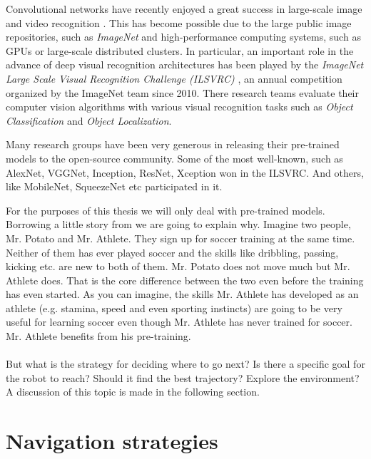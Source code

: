 \documentclass[12pt,a4paper]{report}
\newcommand{\term}{\textit}
\newcommand{\acronym}{\MakeUppercase}
\begin{document}
	Convolutional networks have recently enjoyed a great success in large-scale image 
	and video recognition \citep{vgg}. This has become possible due to the large public 
	image repositories, such as \term{ImageNet} \citep{Deng} and high-performance 
	computing systems, such as \acronym{gpu}s or large-scale distributed clusters. In 
	particular, an important role in the advance of deep visual recognition architectures 
	has been played by the \term{ImageNet Large Scale Visual Recognition Challenge 
	(\acronym{ilsvrc})} \citep{Russakovsky}, an annual competition organized by the 
	ImageNet team since 2010. There research teams evaluate their computer vision 
	algorithms with various visual recognition tasks such as \term{Object Classification} 
	and \term{Object Localization}.
	\par
	Many research groups have been very generous in releasing their pre-trained 
	models to the open-source community. Some of the most well-known, such as AlexNet, 
	VGGNet, Inception, ResNet, Xception \citep{alexnet, vgg} won in the \acronym{ilsvrc}. 
	And others, like MobileNet, SqueezeNet etc participated in it.
	\par
	For the purposes of this thesis we will only deal with pre-trained models. Borrowing 
	a little story from \citet{Gupta} we are going to explain why. Imagine two people, 
	Mr. Potato and Mr. Athlete. They sign up for soccer training at the same time. 
	Neither of them has ever played soccer and the skills like dribbling, passing, 
	kicking etc. are new to both of them. Mr. Potato does not move much but Mr. Athlete 
	does. That is the core difference between the two even before the training has even 
	started. As you can imagine, the skills Mr. Athlete has developed as an athlete 
	(e.g. stamina, speed and even sporting instincts) are going to be very useful for 
	learning soccer even though Mr. Athlete has never trained for soccer. Mr. Athlete 
	benefits from his pre-training.
	\\\\
	
	
	
	
	But what is the strategy for deciding where to go next? Is there a specific goal 
	for the robot to reach? Should it find the best trajectory? Explore the 
	environment? A discussion of this topic is made in the following section.
	\\
	
	\section{Navigation strategies}
	\label{sec:bg:goals}
	
\end{document}
